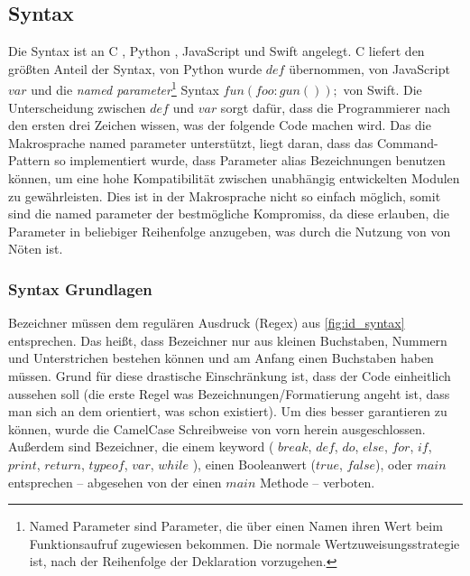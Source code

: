   \subsection{Syntax}
  \label{ssec:Syntax}
    Die Syntax ist an C \autocite{C-std}, Python \autocite{Python-std}, JavaScript \autocite{Ecma-std} und Swift \autocite{Swift-std} angelegt. C liefert den größten Anteil der Syntax, von Python wurde \myMIn$def$ übernommen, von JavaScript \myMIn$var$ und die \emph{named parameter}\footnote{
      Named Parameter sind Parameter, die über einen Namen ihren Wert beim Funktionsaufruf zugewiesen bekommen. Die normale Wertzuweisungsstrategie ist, nach der Reihenfolge der Deklaration vorzugehen.
    }
    Syntax \myMIn$fun(foo:gun());$ von Swift. Die Unterscheidung zwischen \myMIn$def$ und \myMIn$var$ sorgt dafür, dass die Programmierer nach den ersten drei Zeichen wissen, was der folgende Code machen wird. Das die Makrosprache named parameter unterstützt, liegt daran, dass das Command-Pattern so implementiert wurde, dass Parameter alias Bezeichnungen benutzen können, um eine hohe Kompatibilität zwischen unabhängig entwickelten Modulen zu gewährleisten. Dies ist in der Makrosprache nicht so einfach möglich, somit sind die named parameter der bestmögliche Kompromiss, da diese erlauben, die Parameter in beliebiger Reihenfolge anzugeben, was durch die Nutzung von  von Nöten ist.

    \subsubsection{Syntax Grundlagen}
    \label{sssec:Syntax Grundlagen}
      Bezeichner müssen dem regulären Ausdruck (Regex) aus \autoref{fig:id_syntax} entsprechen. Das heißt, dass Bezeichner nur aus kleinen Buchstaben, Nummern und Unterstrichen bestehen können und am Anfang einen Buchstaben haben müssen. Grund für diese drastische Einschränkung ist, dass der Code einheitlich aussehen soll (die erste Regel was Bezeichnungen/Formatierung angeht ist, dass man sich an dem orientiert, was schon existiert). Um dies besser garantieren zu können, wurde die CamelCase Schreibweise von vorn herein ausgeschlossen. Außerdem sind Bezeichner, die einem keyword
      (%
        \myMIn$break$,
        \myMIn$def$,
        \myMIn$do$,
        \myMIn$else$,
        \myMIn$for$,
        \myMIn$if$,
        \myMIn$print$,
        \myMIn$return$,
        \myMIn$typeof$,
        \myMIn$var$,
        \myMIn$while$%
      ), einen Booleanwert (\myMIn$true$, \myMIn$false$), oder \myMIn$main$ entsprechen -- abgesehen von der einen \myMIn$main$ Methode -- verboten.

